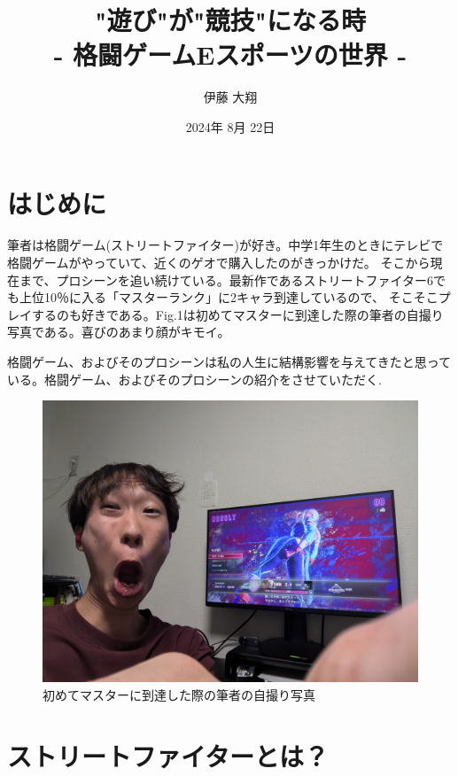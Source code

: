 \documentclass[twocolumn, a4paper]{Zemiresume}
\title{"遊び"が"競技"になる時 \\ - 格闘ゲームEスポーツの世界 -}
\date{2024年 8月 22日}
\author{伊藤 大翔}
\begin{document}
\maketitle

\section{はじめに}
筆者は格闘ゲーム(ストリートファイター)が好き。中学1年生のときにテレビで格闘ゲームがやっていて、近くのゲオで購入したのがきっかけだ。
そこから現在まで、プロシーンを追い続けている。最新作であるストリートファイター6でも上位10％に入る「マスターランク」に2キャラ到達しているので、
そこそこプレイするのも好きである。Fig.1は初めてマスターに到達した際の筆者の自撮り写真である。喜びのあまり顔がキモイ。

格闘ゲーム、およびそのプロシーンは私の人生に結構影響を与えてきたと思っている。格闘ゲーム、およびそのプロシーンの紹介をさせていただく.
\begin{figure}[t]
  \centering
  \includegraphics[width=\columnwidth]{img/SF6_Master.jpg}
  \caption{初めてマスターに到達した際の筆者の自撮り写真}\label{fig:sf6_master}
\end{figure}


\section{ストリートファイターとは？}
\end{document}
